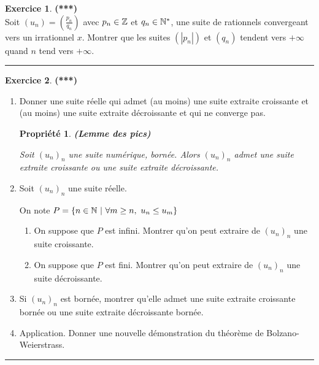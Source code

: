 \documentclass[a4paper,11pt]{article}
\newtheorem{prop}{Propriété}
\theoremstyle{definition}
\newtheorem{exo}{Exercice} %
\begin{document}
\begin{minipage}{1\linewidth}
\begin{minipage}[t]{0.48\linewidth}
	
		
	
\begin{exo}\textbf{(***)}\quad\\[0.2cm]
	Soit $(u_n)=\left(\frac{p_n}{q_n}\right)$ avec $p_n\in\mathbb{Z}$ et $q_n\in\mathbb{N}^*$, une suite de rationnels convergeant vers un irrationnel $x$. Montrer que les suites $(|p_n|)$ et $(q_n)$ tendent vers $+\infty$ quand $n$ tend vers $+\infty$.
	
	\centering
	\rule{1\linewidth}{0.6pt}
\end{exo}
		

		
		
		
	\end{minipage}	
	\hfill\vrule\hfill
	\begin{minipage}[t]{0.48\linewidth}
		\raggedright
		

		
		
		\begin{exo}\textbf{(***)}\quad\\[0.2cm]
		
			\begin{enumerate}
				\item Donner une suite réelle qui admet (au moins) une suite extraite croissante et (au moins) une suite extraite décroissante et qui ne converge pas.
			\begin{prop}\textbf{(Lemme des pics)}
					
					Soit $(u_n)_n$ une suite numérique, bornée.
					Alors $(u_n)_n$ admet une suite extraite croissante ou une suite extraite décroissante.
				\end{prop}
				
				
				\item Soit $(u_n)_n$ une suite réelle.
				
				On note $P = \{n \in \mathbb{N} \ | \ \forall m \geq n,\ u_n \leq u_m \}$
				\begin{enumerate}
					\item On suppose que $P$ est infini. Montrer qu'on peut extraire de $(u_n)_n$ une suite croissante.
					\item On suppose que $P$ est fini. Montrer qu'on peut extraire de $(u_n)_n$ une suite décroissante.
				\end{enumerate}
				\item Si $(u_n)_n$ est bornée, montrer qu'elle admet une suite extraite croissante bornée ou une suite extraite décroissante bornée. 
				\item Application. Donner une nouvelle démonstration du théorème de Bolzano-Weierstrass.
			\end{enumerate}
			\centering
			\rule{1\linewidth}{0.6pt}
		\end{exo}
		
	
		
		
		
	\end{minipage}
\end{minipage}
\end{document}
